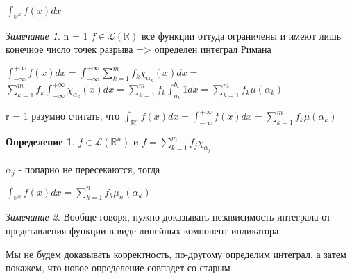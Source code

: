 \documentclass[a4paper, 12pt]{article}
\theoremstyle{definition}
\newtheorem*{definition}{Определение}
\theoremstyle{remark}
\newtheorem*{remark}{Замечание}
\begin{document}
$\int_{\mathbb{R}^n}f(x)dx$
\begin{remark}
     n = 1 $f\in \mathcal{L}(\mathbb{R})$ все функции оттуда ограничены и имеют лишь конечное число точек разрыва => определен интеграл Римана

     $\int_{-\infty}^{+\infty} f(x)dx = \int_{-\infty}^{+\infty}\sum_{k=1}^m f_k \chi_{\alpha_k}(x)dx =$
     $\sum_{k=1}^m f_k \int_{-\infty}^{+\infty}\chi_{\alpha_k}(x)dx = \sum_{k=1}^m f_k \int_{a_k}^{b_k}1dx = \sum_{k=1}^m f_k \mu(\alpha_k)$

     r = 1 разумно считать, что $\int_{\mathbb{R}^n}f(x)dx = \int_{-\infty}^{+\infty} f(x)dx =\sum_{k=1}^m f_k \mu(\alpha_k)$
\end{remark}
\begin{definition}
     $f\in\mathcal{L}(\mathbb{R} ^n)$ и $f = \sum_{k=1}^m f_j \chi_{\alpha_j}$

     $\alpha_j$ - попарно не пересекаются, тогда

     $\int_{\mathbb{R}^n}f(x)dx = \sum_{k=1}^n f_k \mu_n(\alpha_k)$
\end{definition}
\begin{remark}
     Вообще говоря, нужно доказывать независимость интеграла от представления функции в виде линейных компонент
     индикатора

     Мы не будем доказывать корректность, по-другому определим интеграл, а затем покажем, что новое определение совпадет со старым
\end{remark}
\end{document}
